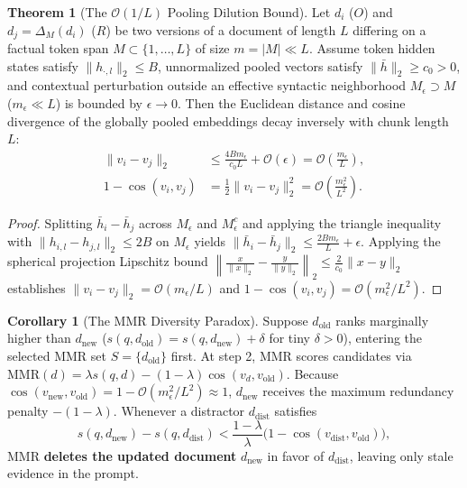 \documentclass[11pt,a4paper]{article}
\theoremstyle{definition}
\newtheorem{theorem}{Theorem}
\newtheorem{corollary}{Corollary}
\begin{document}
\begin{theorem}[The $\mathcal{O}(1/L)$ Pooling Dilution Bound]
Let $d_i$ ($O$) and $d_j = \Delta_M(d_i)$ ($R$) be two versions of a document of length $L$ differing on a factual token span $M \subset \{1, \dots, L\}$ of size $m = |M| \ll L$. Assume token hidden states satisfy $\|h_{\cdot, l}\|_2 \le B$, unnormalized pooled vectors satisfy $\|\bar{h}\|_2 \ge c_0 > 0$, and contextual perturbation outside an effective syntactic neighborhood $M_\epsilon \supset M$ ($m_\epsilon \ll L$) is bounded by $\epsilon \to 0$. Then the Euclidean distance and cosine divergence of the globally pooled embeddings decay inversely with chunk length $L$:
\begin{align}
\|v_i - v_j\|_2 &\le \frac{4 B m_\epsilon}{c_0 L} + \mathcal{O}(\epsilon) = \mathcal{O}\!\left(\frac{m_\epsilon}{L}\right), \\
1 - \cos(v_i, v_j) &= \frac{1}{2}\|v_i - v_j\|_2^2 = \mathcal{O}\!\left(\frac{m_\epsilon^2}{L^2}\right).
\end{align}
\end{theorem}

\begin{proof}
Splitting $\bar{h}_i - \bar{h}_j$ across $M_\epsilon$ and $M_\epsilon^c$ and applying the triangle inequality with $\|h_{i,l} - h_{j,l}\|_2 \le 2B$ on $M_\epsilon$ yields $\|\bar{h}_i - \bar{h}_j\|_2 \le \frac{2Bm_\epsilon}{L} + \epsilon$. Applying the spherical projection Lipschitz bound $\left\|\frac{x}{\|x\|_2} - \frac{y}{\|y\|_2}\right\|_2 \le \frac{2}{c_0}\|x - y\|_2$ establishes $\|v_i - v_j\|_2 = \mathcal{O}(m_\epsilon / L)$ and $1 - \cos(v_i, v_j) = \mathcal{O}(m_\epsilon^2 / L^2)$.
\end{proof}

\begin{corollary}[The MMR Diversity Paradox]
Suppose $d_{\mathrm{old}}$ ranks marginally higher than $d_{\mathrm{new}}$ ($s(q, d_{\mathrm{old}}) = s(q, d_{\mathrm{new}}) + \delta$ for tiny $\delta > 0$), entering the selected MMR set $S = \{d_{\mathrm{old}}\}$ first. At step 2, MMR scores candidates via $\mathrm{MMR}(d) = \lambda s(q, d) - (1 - \lambda)\cos(v_d, v_{\mathrm{old}})$. Because $\cos(v_{\mathrm{new}}, v_{\mathrm{old}}) = 1 - \mathcal{O}(m_\epsilon^2 / L^2) \approx 1$, $d_{\mathrm{new}}$ receives the maximum redundancy penalty $-(1 - \lambda)$. Whenever a distractor $d_{\mathrm{dist}}$ satisfies
\begin{equation}
s(q, d_{\mathrm{new}}) - s(q, d_{\mathrm{dist}}) < \frac{1 - \lambda}{\lambda}\bigl(1 - \cos(v_{\mathrm{dist}}, v_{\mathrm{old}})\bigr),
\end{equation}
MMR \textbf{deletes the updated document} $d_{\mathrm{new}}$ in favor of $d_{\mathrm{dist}}$, leaving only stale evidence in the prompt.
\end{corollary}
\end{document}
